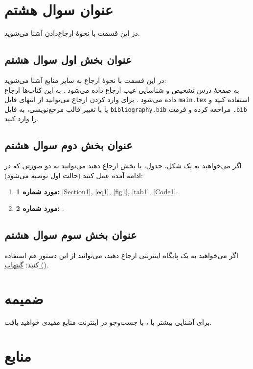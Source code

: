 \documentclass{article}
\begin{document}
\section{عنوان سوال هشتم}
در این قسمت با نحوۀ ارجاع‌دادن آشنا می‌شوید.
\subsection{عنوان بخش اول سوال هشتم}
در این قسمت با نحوۀ ارجاع به سایر منابع آشنا می‌شوید:\\
\indent
به صفحۀ درس تشخیص و شناسایی عیب ارجاع داده می‌شود \cite{b1}. 
به این کتاب‌ها ارجاع داده می‌شود \cite{b2}\cite{b3}.
برای وارد کردن ارجاع می‌توانید از انتهای فایل 
\verb|main.tex|
استفاده کنید و یا با تغییر قالب مرجع‌نویسی،
به فایل
\verb|bibliography.bib|
مراجعه کرده و فرمت
\verb|.bib|
را وارد کنید.
\subsection{عنوان بخش دوم سوال هشتم}
اگر می‌خواهید به یک شکل، جدول، یا بخش ارجاع دهید می‌توانید به دو صورتی که در ادامه آمده عمل کنید (حالت اول توصیه می‌شود):
\begin{enumerate}
    \item \textbf{مورد شماره 1:} \autoref{Section1}, \autoref{eq1}, \autoref{fig1}, \autoref{tab1}, \autoref{Code1}.
    \item \textbf{مورد شماره 2:} .
\end{enumerate}
\subsection{عنوان بخش سوم سوال هشتم}
اگر می‌خواهید به یک پایگاه اینترنتی ارجاع دهید، می‌توانید از این دستور هم استفاده کنید:
\href{https://github.com/MJAHMADEE/ARASLaTeXFormats}{گیتهاب ()}.

\section{ضمیمه}
برای آشنایی بیشتر با \lr{\LaTeX}، با جست‌و‌جو در اینترنت منابع مفیدی خواهید یافت.


\section*{منابع}
\end{document}

